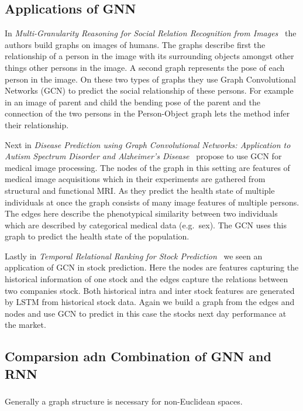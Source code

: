 \documentclass{article}
\begin{document}
\subsection{Applications of GNN}
In \textit{Multi-Granularity Reasoning for Social Relation Recognition from Images}~\cite{zhang2019} the authors build graphs on images of humans.
The graphs describe first the relationship of a person in the image with its surrounding objects amongst other things other persons in the image.
A second graph represents the pose of each person in the image.
On these two types of graphs they use Graph Convolutional Networks (GCN) to predict the social relationship of these persons.
For example in an image of parent and child the bending pose of the parent and the connection of the two persons in the Person-Object graph lets the method infer their relationship.

Next in \textit{Disease Prediction using Graph Convolutional Networks: Application to Autism Spectrum Disorder and Alzheimer's Disease}~\cite{parisot2018} propose to use GCN for medical image processing.
The nodes of the graph in this setting are features of medical image acquisitions which in their experiments are gathered from structural and functional MRI.
As they predict the health state of multiple individuals at once the graph consists of many image features of multiple persons.
The edges here describe the phenotypical similarity between two individuals which are described by categorical medical data (e.g.\ sex).
The GCN uses this graph to predict the health state of the population.


Lastly in \textit{Temporal Relational Ranking for Stock Prediction}~\cite{feng2019} we seen an application of GCN in stock prediction.
Here the nodes are features capturing the historical information of one stock and the edges capture the relations between two companies stock.
Both historical intra and inter stock features are generated by LSTM from historical stock data.
Again we build a graph from the edges and nodes and use GCN to predict in this case the stocks next day performance at the market.

\subsection{Comparsion adn Combination of GNN and RNN}
\subsubsection{}
Generally a graph structure is necessary for non-Euclidean spaces.
\subsubsection{}



\end{document}
